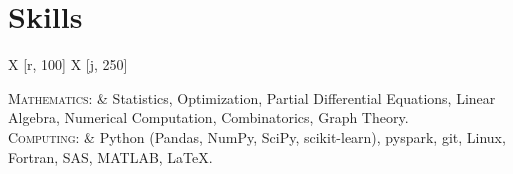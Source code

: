 \documentclass[letterpaper,11pt]{article} %
\newcommand\tabuwidth{\textwidth}  %
\newcommand\rcol{250}  %
\begin{document}
\section{Skills}

\begin{center}
\begin{tabu} to \tabuwidth {X [r, 100] X [j, \rcol]}

\textsc{Mathematics:} & Statistics, Optimization, Partial Differential Equations, Linear Algebra, Numerical Computation, Combinatorics, Graph Theory.\\
\textsc{Computing:} & Python (Pandas, NumPy, SciPy, scikit-learn), pyspark, git, Linux, Fortran, SAS, MATLAB, \LaTeX.\\

\end{tabu}
\end{center}
\end{document}
